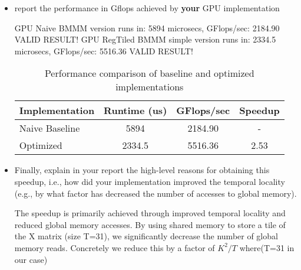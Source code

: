 \documentclass{article}
\begin{document}
\begin{itemize}
    \item report the performance in Gflops achieved by \textbf{your} GPU implementation
    
    GPU Naive BMMM version runs in: 5894 microsecs, GFlops/sec: 2184.90
    VALID RESULT!
    GPU RegTiled BMMM simple version runs in: 2334.5 microsecs, GFlops/sec: 5516.36
    VALID RESULT!

    \begin{table}[h]
        \centering
        \begin{tabular}{|l|c|c|c|}
        \hline
        \textbf{Implementation} & \textbf{Runtime (us)} & \textbf{GFlops/sec} & \textbf{Speedup} \\
        \hline
        Naive Baseline & 5894 & 2184.90 & -\\
        Optimized & 2334.5 & 5516.36 & 2.53 \\
        \hline
        \end{tabular}
        \caption{Performance comparison of baseline and optimized implementations}
        \label{tab:performance-comparison}
    \end{table}
    
    \item Finally, explain in your report the high-level reasons for obtaining
    this speedup, i.e., how did your implementation improved the temporal
    locality (e.g., by what factor has decreased the number of accesses to
    global memory).

    The speedup is primarily achieved through improved temporal locality and reduced global memory accesses. By using shared memory to store a tile of the X matrix (size T=31), we significantly decrease the number of global memory reads. 
    Concretely we reduce this by a factor of $K^2/T$ where(T=31 in our case)
    



\end{itemize}
\end{document}
